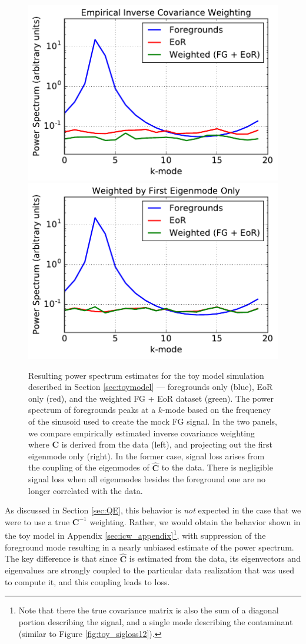 \documentclass[preprint2,numberedappendix,tighten]{aastex6}  %
\begin{document}
\begin{figure}
	\centering
	\includegraphics[trim={0cm 0cm 0cm 0cm},clip,height=0.33\textwidth]{plots/toy_sigloss3.pdf}
	\includegraphics[trim={0cm 0cm 0cm 0cm},clip,height=0.33\textwidth]{plots/toy_sigloss4.pdf}
	\caption{Resulting power spectrum estimates for the toy model simulation described in Section \ref{sec:toymodel} --- foregrounds only (blue), EoR only (red), and the weighted FG + EoR dataset (green). The power spectrum of foregrounds peaks at a $k$-mode based on the frequency of the sinusoid used to create the mock FG signal. In the two panels, we compare empirically estimated inverse covariance weighting where $\textbf{C}$ is derived from the data (left), and projecting out the first eigenmode only (right). In the former case, signal loss arises from the coupling of the eigenmodes of $\widehat{\textbf{C}}$ to the data. 
There is negligible signal loss when all eigenmodes besides the foreground one are no longer correlated with the data.
}
	\label{fig:toy_sigloss3}
\end{figure}

As discussed in Section \ref{sec:QE}, this behavior is {\it not} expected in the case that we were to use a true $\textbf{C}^{-1}$ weighting.  Rather, we would obtain the behavior shown in the toy model in Appendix \ref{sec:icw_appendix}\footnote{Note that there the true covariance matrix is also the sum of a diagonal portion describing the signal, and a single mode describing the contaminant (similar to Figure \ref{fig:toy_sigloss12}).}, with suppression of the foreground mode resulting in a nearly unbiased estimate of the power spectrum.   The key difference is that since $\widehat{\textbf{C}}$ is estimated from the data, its eigenvectors and eigenvalues are strongly coupled to the particular data realization that was used to compute it, and this coupling leads to loss.
\end{document}
